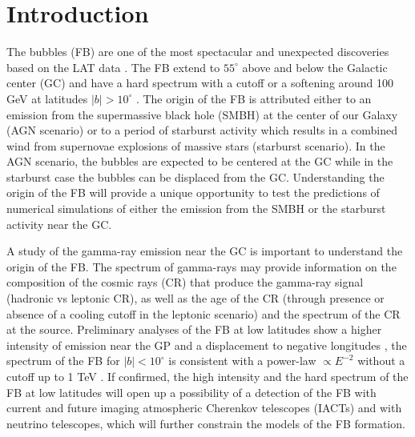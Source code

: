 \section{Introduction}



The \Fermi bubbles (FB) are one of the most spectacular and unexpected discoveries based on the \Fermi LAT data
\citep{2010ApJ...724.1044S}.
The FB extend to $55^\circ$ above and below the Galactic center (GC)
and have a hard spectrum with a cutoff or a softening around 100 GeV at latitudes $|b| > 10^\circ$ \citep{2014ApJ...793...64A}.
The origin of the FB is attributed either to an emission from the supermassive black hole (SMBH) at
the center of our Galaxy (AGN scenario) \citep{2010ApJ...724.1044S}
or to a period of starburst activity which results in a combined wind
from supernovae explosions of massive stars (starburst scenario). %
In the AGN scenario, the bubbles are expected to be centered at the GC while
in the starburst case the bubbles can be displaced from the GC.
Understanding the origin of the FB will provide a unique opportunity to test the predictions of numerical simulations 
of either the emission from the SMBH or the starburst activity near the GC.

A study of the gamma-ray emission near the GC is important to understand the origin of the FB.
The spectrum of gamma-rays may provide information on the composition of the 
cosmic rays (CR) that produce the gamma-ray signal (hadronic vs leptonic CR),
as well as the age of the CR (through presence or absence of a cooling cutoff in the leptonic scenario)
and the spectrum of the CR at the source.
Preliminary analyses of the FB at low latitudes show a higher intensity of emission near the GP and a displacement
to negative longitudes \citep{2016ApJS..223...26A, 2017ApJ...840...43A},
the spectrum of the FB for $|b| < 10^\circ$ is consistent with a power-law $\propto E^{-2}$ 
without a cutoff up to 1 TeV \citep{2017ApJ...840...43A}.
If confirmed, the high intensity and the hard spectrum
of the FB at low latitudes will open up a possibility of a detection of the FB with current and future imaging atmospheric Cherenkov telescopes (IACTs)
and with neutrino telescopes, which will further constrain the models of the FB formation.

